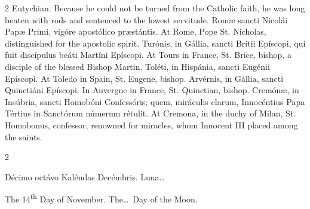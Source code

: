 \begin{paracol}{2}
 Eutychian. Because he could not be turned from the Catholic faith, he 
 was long beaten with rods and sentenced to the lowest servitude.
\switchcolumn*
{}
Romæ sancti Nicolái Papæ Primi, vigóre apostólico præstántis.
\switchcolumn
{}
At Rome, Pope St. Nicholas, 
 distinguished for the apostolic spirit.
\switchcolumn*
{}
Turónis, in Gállia, 
 sancti Brítii Epíscopi, qui fuit discípulus beáti Martíni Epíscopi.
\switchcolumn
{}
At Tours in France, St. Brice, 
 bishop, a disciple of the blessed Bishop Martin.
\switchcolumn*
{}
Toléti, in Hispánia, 
 sancti Eugénii Epíscopi.
\switchcolumn
{}
At Toledo in Spain, St. Eugene, 
 bishop.
\switchcolumn*
{}
Arvérnis, in Gállia, 
 sancti Quinctiáni Epíscopi.
\switchcolumn
{}
In Auvergne in France, St. Quinctian, 
 bishop.
\switchcolumn*
{}
Cremónæ, in Insúbria, 
 sancti Homobóni Confessóris; quem, miráculis clarum, Innocéntius Papa 
 Tértius in Sanctórum númerum rétulit.
\switchcolumn
{}
At Cremona, in the duchy of Milan, 
 St. Homobonus, confessor, renowned for miracles, whom Innocent III placed 
 among the saints.
\switchcolumn*
{}
\end{paracol}


\begin{paracol}{2}
\begin{center}{\color{gregoriocolor} Décimo octávo Kaléndas Decémbris. 
 Luna\dots\ }\end{center}
\switchcolumn
{}
\begin{center}{\color{gregoriocolor} The 
 14\textsuperscript{th} Day of 
 November. The\dots\ Day of the Moon.}\end{center}
\end{paracol}

